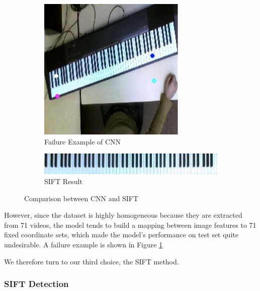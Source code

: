 \documentclass[10pt,twocolumn,letterpaper]{article}
\begin{document}
\begin{figure}[h!]
   \centering
   \begin{subfigure}{0.25\textwidth}
      \includegraphics[width=\linewidth]{fig/8.png}
      \caption{Failure Example of CNN} \label{fig:f}
    \end{subfigure}
    \begin{subfigure}{0.30\textwidth}
      \includegraphics[width=\linewidth]{fig/9.jpg}
      \caption{SIFT Result} \label{fig:g}
    \end{subfigure}
   \caption{Comparison between CNN and SIFT} \label{fig:2}
\end{figure}

However, since the dataset is highly homogeneous because they are extracted from 71 videos, the model tends to build a mapping between image features to 71 fixed coordinate sets, which made the model’s performance on test set quite undesirable.
A failure example is shown in Figure \ref{fig:f}

We therefore turn to our third choice, the SIFT method.

\subsubsection{SIFT Detection}
\end{document}

